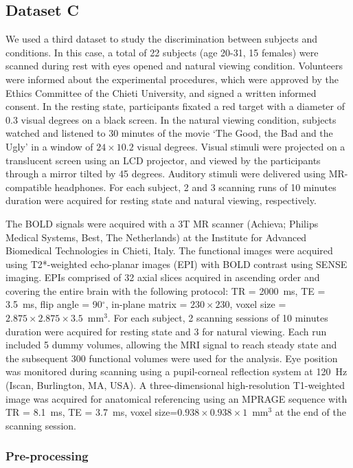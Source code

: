 \documentclass{article}
\begin{document}
\subsection{Dataset C}

We used a third dataset to study the discrimination between subjects and conditions. In this case, a total of 22 subjects (age 20-31, 15 females) were scanned during rest with eyes opened and natural viewing condition. Volunteers were informed about the experimental procedures, which were approved by the Ethics Committee of the Chieti University, and signed a written informed consent.
In the resting state, participants fixated a red target with a diameter of 0.3 visual degrees on a black screen. In the natural viewing condition, subjects watched and listened to 30 minutes of the movie `The Good, the Bad and the Ugly' in a window of $24\times10.2$ visual degrees. Visual stimuli were projected on a translucent screen using an LCD projector, and viewed by the participants through a mirror tilted by 45 degrees. Auditory stimuli were delivered using MR-compatible headphones.
For each subject, 2 and 3 scanning runs of 10 minutes duration were acquired for resting state and natural viewing, respectively. 

The BOLD signals were acquired with a 3T MR scanner (Achieva; Philips Medical Systems, Best, The Netherlands) at the Institute for Advanced Biomedical Technologies in Chieti, Italy. The functional images were acquired using T2*-weighted echo-planar images (EPI) with BOLD contrast using SENSE imaging. EPIs comprised of 32 axial slices acquired in ascending order and covering the entire brain with the following protocol: TR = 2000~ms, TE = 3.5~ms, flip angle = 90$^\circ$, in-plane matrix = $230\times230$, voxel size = $2.875\times2.875\times3.5$~mm$^3$. For each subject, 2 scanning sessions of 10 minutes duration were acquired for resting state and 3 for natural viewing. Each run included 5 dummy volumes, allowing the MRI signal to reach steady state and the subsequent 300 functional volumes were used for the analysis. Eye position was monitored during scanning using a pupil-corneal reflection system at 120~Hz (Iscan, Burlington, MA, USA). A three-dimensional high-resolution T1-weighted image was acquired for anatomical referencing using an MPRAGE sequence with TR = 8.1~ms, TE = 3.7~ms, voxel size=$0.938\times0.938\times1$~mm$^3$ at the end of the scanning session.

\subsubsection{Pre-processing}
\end{document}
